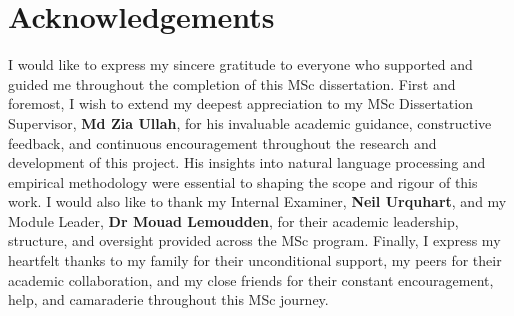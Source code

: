 \newpage
{}

\section*{Acknowledgements}

I would like to express my sincere gratitude to everyone who supported and guided me throughout the completion of this MSc dissertation.
\newline \newline First and foremost, I wish to extend my deepest appreciation to my MSc Dissertation Supervisor, \textbf{Md Zia Ullah}, for his invaluable academic guidance, constructive feedback, and continuous encouragement throughout the research and development of this project. His insights into natural language processing and empirical methodology were essential to shaping the scope and rigour of this work.
\newline \newline I would also like to thank my Internal Examiner, \textbf{Neil Urquhart}, and my Module Leader, \textbf{Dr Mouad Lemoudden}, for their academic leadership, structure, and oversight provided across the MSc program.
\newline \newline Finally, I express my heartfelt thanks to my family for their unconditional support, my peers for their academic collaboration, and my close friends for their constant encouragement, help, and camaraderie throughout this MSc journey.
